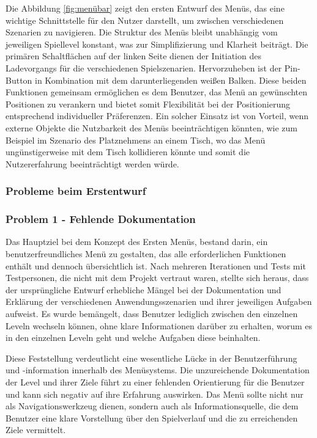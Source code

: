 Die Abbildung \ref{fig:menübar} zeigt den ersten Entwurf des Menüs, das eine wichtige Schnittstelle für den Nutzer
darstellt, um zwischen verschiedenen Szenarien zu navigieren. Die Struktur des Menüs bleibt unabhängig vom jeweiligen
Spiellevel konstant, was zur Simplifizierung und Klarheit beiträgt. Die primären Schaltflächen auf der linken Seite
dienen der Initiation des Ladevorgangs für die verschiedenen Spielszenarien. Hervorzuheben ist der Pin-Button in
Kombination mit dem darunterliegenden weißen Balken. Diese beiden Funktionen gemeinsam ermöglichen es dem Benutzer,
das Menü an gewünschten Positionen zu verankern und bietet somit Flexibilität bei der Positionierung entsprechend
individueller Präferenzen. Ein solcher Einsatz ist von Vorteil, wenn externe Objekte die Nutzbarkeit des Menüs
beeinträchtigen könnten, wie zum Beispiel im Szenario des Platznehmens an einem Tisch, wo das Menü ungünstigerweise
mit dem Tisch kollidieren könnte und somit die Nutzererfahrung beeinträchtigt werden würde.

\subsubsection{Probleme beim Erstentwurf}
\subsubsection*{Problem 1 - Fehlende Dokumentation}
Das Hauptziel bei dem Konzept des Ersten Menüs, bestand darin, ein benutzerfreundliches Menü zu gestalten, das alle
erforderlichen Funktionen enthält und dennoch übersichtlich ist. Nach mehreren Iterationen und Tests mit Testpersonen,
die nicht mit dem Projekt vertraut waren, stellte sich heraus, dass der ursprüngliche Entwurf erhebliche Mängel bei der
Dokumentation und Erklärung der verschiedenen Anwendungsszenarien und ihrer jeweiligen Aufgaben aufweist. Es wurde
bemängelt, dass Benutzer lediglich zwischen den einzelnen Leveln wechseln können, ohne klare Informationen darüber zu
erhalten, worum es in den einzelnen Leveln geht und welche Aufgaben diese beinhalten.

Diese Feststellung verdeutlicht eine wesentliche Lücke in der Benutzerführung und -information innerhalb des Menüsystems.
Die unzureichende Dokumentation der Level und ihrer Ziele führt zu einer fehlenden Orientierung für die Benutzer und
kann sich negativ auf ihre Erfahrung auswirken. Das Menü sollte nicht nur als Navigationswerkzeug dienen, sondern auch
als Informationsquelle, die dem Benutzer eine klare Vorstellung über den Spielverlauf und die zu erreichenden Ziele vermittelt.


